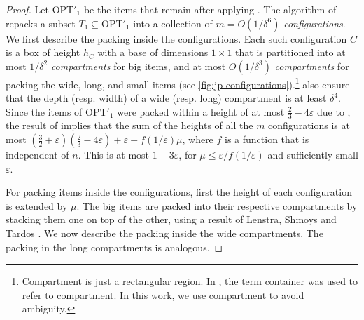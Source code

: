 \documentclass[10pt,a4paper]{amsart}
\newcommand{\kvn}[1]{#1}
\newcommand{\eps}{\varepsilon}
\renewcommand{\epsilon}{\varepsilon} %
\theoremstyle{definition}
\begin{document}
\begin{proof}
Let $\text{OPT}'_1$ be the items that remain after applying . 
The algorithm of \cite{3d-strip-packing} repacks a subset $T_1 \subseteq \text{OPT}'_1$ into a collection of $m = O(1/\delta^6)$ {\em configurations}. We first describe the packing inside the configurations. Each such configuration $C$ is a box of height $h_C$ with a base of dimensions $1\times 1$ that is partitioned into at most $1/\delta^2$ {\em compartments} for big items, and at most $O(1/\delta^3)$ {\em compartments} for packing the wide, long, and small items (see \cref{fig:jp-configurations}).\footnote{Compartment is just a rectangular region.
In \cite{3d-strip-packing}, the term container was used to refer to compartment. In this work, we use compartment to avoid ambiguity.} 
\kvn{\cite{jansen-pradel-bin-packing,3d-strip-packing} also ensure that the depth (resp. width) of a wide (resp. long) compartment is at least $\delta^4$.}
Since the items of $\text{OPT}'_1$ were packed within a height of at most $\frac{2}{3}-4\epsilon$ due to , the result of \cite{3d-strip-packing} implies that the sum of the heights of all the $m$ configurations is at most $\left(\frac{3}{2}+\epsilon\right)\left(\frac{2}{3}-4\epsilon\right)+\epsilon+
f(1/\eps)\mu$, where $f$ is a function that is independent of $n$.  
This is at most $1-3\epsilon$, for $\mu \le \eps / f(1/\eps)$ and sufficiently small $\epsilon$. 

 


For packing items inside the configurations, first the height of each configuration is extended by $\mu$. The big items are packed into their respective compartments by stacking them one on top of the other, using a result of Lenstra, Shmoys and Tardos \cite{lenstra-scheduling}.
We now describe the packing inside the wide compartments. The packing in the long compartments is analogous.




\end{proof}
\end{document}
